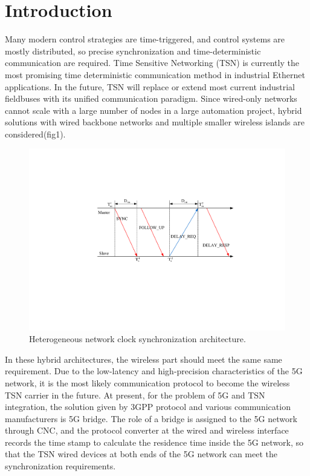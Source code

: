 \documentclass[conference]{IEEEtran}
\begin{document}
	\section{Introduction}
	Many modern control strategies are time-triggered, and control systems are mostly distributed, so precise synchronization and time-deterministic communication are required.
	Time Sensitive Networking (TSN) is currently the most promising time deterministic communication method in industrial Ethernet applications. In the future, TSN will replace or extend most current industrial fieldbuses with its unified communication paradigm.
	Since wired-only networks cannot scale with a large number of nodes in a large automation project, hybrid solutions with wired backbone networks and multiple smaller wireless islands are considered(fig1). 
	\begin{figure}[htbp]	
		\centerline{\includegraphics[scale=0.5]{fig2.eps}}
		\caption{Heterogeneous network clock synchronization architecture.}
		\label{fig1}
	\end{figure}
	In these hybrid architectures, the wireless part should meet the same same requirement.
	Due to the low-latency and high-precision characteristics of the 5G network, it is the most likely communication protocol to become the wireless TSN carrier in the future. At present, for the problem of 5G and TSN integration, the solution given by 3GPP protocol and various communication manufacturers is 5G bridge. The role of a bridge is assigned to the 5G network through CNC, and the protocol converter at the wired and wireless interface records the time stamp to calculate the residence time inside the 5G network, so that the TSN wired devices at both ends of the 5G network can meet the synchronization requirements.
\end{document}
